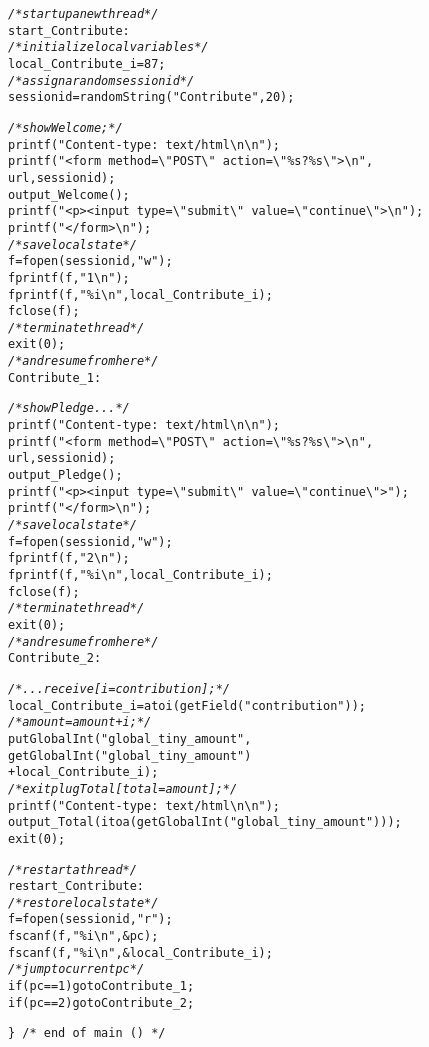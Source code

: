\begin{slide*}
\begin{scriptsize}
\begin{alltt}

\textit{/* start up a new thread */}
start_Contribute:
\textit{/* initialize local variables */}
local_Contribute_i = 87;
\textit{/* assign a random sessionid */}
sessionid = randomString("Contribute",20);

\textit{/* show Welcome; */}
\verb?printf("Content-type: text/html\n\n");?
\verb$printf("<form method=\"POST\" action=\"%s?%s\">\n",$
       url,sessionid);
output_Welcome();
\verb?printf("<p><input type=\"submit\" value=\"continue\">\n");?
\verb?printf("</form>\n");?
\textit{/* save local state */}
f = fopen(sessionid,"w");
\verb?fprintf(f,"1\n");?
\verb?fprintf(f,"%i\n",local_Contribute_i);?
fclose(f);
\textit{/* terminate thread */}
exit(0);
\textit{/* and resume from here */}
Contribute_1:
\end{alltt}
\end{scriptsize}
\vfil
\end{slide*}

\begin{slide*}
\begin{scriptsize}
\begin{alltt}
\textit{/* show Pledge... */}
\verb?printf("Content-type: text/html\n\n");?
\verb$printf("<form method=\"POST\" action=\"%s?%s\">\n",$
       url,sessionid);
output_Pledge();
\verb?printf("<p><input type=\"submit\" value=\"continue\">");?
\verb?printf("</form>\n");?
\textit{/* save local state */}
f = fopen(sessionid,"w");
\verb?fprintf(f,"2\n");?
\verb?fprintf(f,"%i\n",local_Contribute_i);?
fclose(f);
\textit{/* terminate thread */}
exit(0);
\textit{/* and resume from here */}
Contribute_2:

\textit{/* ...receive[i = contribution]; */}
local_Contribute_i = atoi(getField("contribution"));
\textit{/* amount = amount + i; */}
putGlobalInt("global_tiny_amount",
             getGlobalInt("global_tiny_amount")
             +local_Contribute_i);
\textit{/* exit plug Total[total = amount]; */}
\verb?printf("Content-type: text/html\n\n");?
output_Total(itoa(getGlobalInt("global_tiny_amount"))); 
exit(0);
\end{alltt}
\end{scriptsize}
\vfil
\end{slide*}

\begin{slide*}
\begin{scriptsize}
\begin{alltt}
\textit{/* restart a thread */}
restart_Contribute:
\textit{/* restore local state */}
f = fopen(sessionid,"r");
\verb?fscanf(f,"%i\n",&pc);?
\verb?fscanf(f,"%i\n",&local_Contribute_i);?
\textit{/* jump to current pc */}
if (pc==1) goto Contribute_1;
if (pc==2) goto Contribute_2;

\verb?} /* end of main () */?
\end{alltt}
\end{scriptsize}
\vfil
\end{slide*}
 
